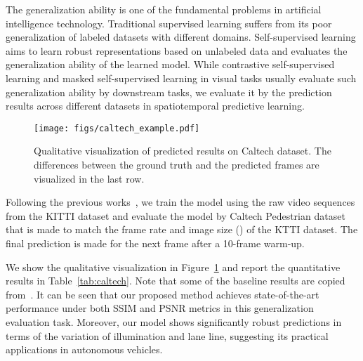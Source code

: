 \documentclass[10pt,twocolumn,letterpaper]{article}
\begin{document}
The generalization ability is one of the fundamental problems in artificial intelligence technology. Traditional supervised learning suffers from its poor generalization of labeled datasets with different domains. Self-supervised learning aims to learn robust representations based on unlabeled data and evaluates the generalization ability of the learned model. While contrastive self-supervised learning and masked self-supervised learning in visual tasks usually evaluate such generalization ability by downstream tasks, we evaluate it by the prediction results across different datasets in spatiotemporal predictive learning. 

\begin{figure}[htbp]
\centering
\texttt{[image: figs/caltech\_example.pdf]} 
\caption{Qualitative visualization of predicted results on Caltech dataset. The differences between the ground truth and the predicted frames are visualized in the last row.}
\label{fig:caltech_example} 
\end{figure}

Following the previous works~\cite{prednet, crevnet, liang2017dual}, we train the model using the raw video sequences from the KITTI dataset and evaluate the model by Caltech Pedestrian dataset that is made to match the frame rate and image size () of the KTTI dataset. The final prediction is made for the next frame after a 10-frame warm-up.

We show the qualitative visualization in Figure~\ref{fig:caltech_example} and report the quantitative results in Table~\ref{tab:caltech}. Note that some of the baseline results are copied from~\cite{oprea2020review}. It can be seen that our proposed method achieves state-of-the-art performance under both SSIM and PSNR metrics in this generalization evaluation task. Moreover, our model shows significantly robust predictions in terms of the variation of illumination and lane line, suggesting its practical applications in autonomous vehicles.
\end{document}
